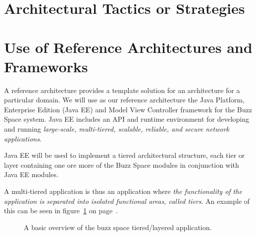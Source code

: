 \documentclass[a4paper,12pt,titlepage]{article}
\begin{document}
\section{Architectural Tactics or Strategies}%
	
\newpage
\section{Use of Reference Architectures and Frameworks}%
A reference architecture provides a template solution for an architecture for a particular domain. We will use as our reference architecture the Java Platform, Enterprise Edition (Java EE) and Model View Controller framework for the Buzz Space system. 
Java EE includes an API and runtime environment for developing and running \textit{large-scale, multi-tiered, scalable, reliable, and secure network applications}.

Java EE will be used to implement a tiered architectural structure, each tier or layer containing one ore more of the Buzz Space modules in conjunction with Java EE modules. 

A multi-tiered application is thus an application where \textit{the functionality of the application is separated into isolated functional areas, called tiers}. An example of this can be seen in figure~\ref{fig:refarchandmvc} on page~\pageref{fig:refarchandmvc}.
\begin{figure}[H]
	\centering
	\caption{A basic overview of the buzz space tiered/layered application.}
	\label{fig:refarchandmvc}
\end{figure}
\newpage
\end{document}
